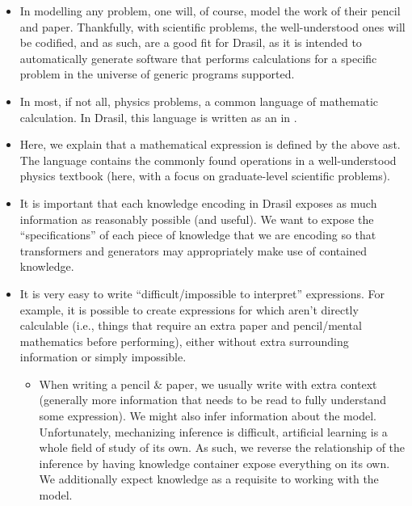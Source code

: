 \begin{itemize}

	\item In modelling any problem, one will, of course, model the work of their
	      pencil and paper. Thankfully, with scientific problems, the
	      well-understood ones will be codified\cite{well-understood}, and as
	      such, are a good fit for Drasil, as it is intended to automatically
	      generate software that performs calculations for a specific problem in
	      the universe of generic programs supported.

	\item In most, if not all, physics problems, a common language of mathematic
	      calculation. In Drasil, this language is written as an  in
	      .

	\item Here, we explain that a mathematical expression is defined by the
	      above \acf{ast}. The language contains the commonly found operations
	      in a well-understood physics textbook (here, with a focus on
	      graduate-level scientific problems).

	\item It is important that each knowledge encoding in Drasil exposes as much
	      information as reasonably possible (and useful). We want to expose the
	      ``specifications'' of each piece of knowledge that we are encoding so
	      that transformers and generators may appropriately make use of
	      contained knowledge.

	\item It is very easy to write ``difficult/impossible to interpret''
	      expressions. For example, it is possible to create expressions for
	      which aren't directly calculable (i.e., things that require an extra
	      paper and pencil/mental mathematics before performing), either without
	      extra surrounding information or simply impossible.

	      \begin{itemize}

		      \item When writing a pencil \& paper, we usually write with extra
		            context (generally more information that needs to be read to
		            fully understand some expression). We might also infer
		            information about the model. Unfortunately, mechanizing
		            inference is difficult, artificial learning is a whole field
		            of study of its own. As such, we reverse the relationship of
		            the inference by having knowledge container expose
		            everything on its own. We additionally expect knowledge as a
		            requisite to working with the model.


\end{itemize}
\end{itemize}

